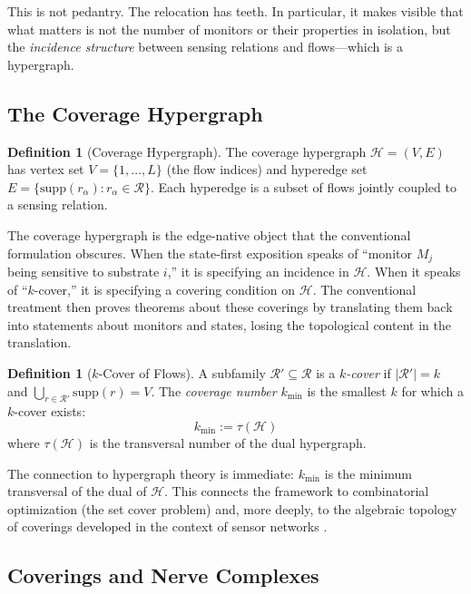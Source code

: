 \documentclass[11pt]{article}
\theoremstyle{definition}
\newtheorem{definition}[theorem]{Definition}
\theoremstyle{remark}
\begin{document}
This is not pedantry. The relocation has teeth. In particular, it makes visible that what matters is not the number of monitors or their properties in isolation, but the \emph{incidence structure} between sensing relations and flows---which is a hypergraph.

\subsection{The Coverage Hypergraph}

\begin{definition}[Coverage Hypergraph]
The coverage hypergraph $\mathcal{H} = (V, E)$ has vertex set $V = \{1, \ldots, L\}$ (the flow indices) and hyperedge set $E = \{\mathrm{supp}(r_\alpha) : r_\alpha \in \mathcal{R}\}$. Each hyperedge is a subset of flows jointly coupled to a sensing relation.
\end{definition}

The coverage hypergraph is the edge-native object that the conventional formulation obscures. When the state-first exposition speaks of ``monitor $M_j$ being sensitive to substrate $i$,'' it is specifying an incidence in $\mathcal{H}$. When it speaks of ``$k$-cover,'' it is specifying a covering condition on $\mathcal{H}$. The conventional treatment then proves theorems about these coverings by translating them back into statements about monitors and states, losing the topological content in the translation.

\begin{definition}[$k$-Cover of Flows]
A subfamily $\mathcal{R}' \subseteq \mathcal{R}$ is a \emph{$k$-cover} if $|\mathcal{R}'| = k$ and $\bigcup_{r \in \mathcal{R}'} \mathrm{supp}(r) = V$. The \emph{coverage number} $k_{\min}$ is the smallest $k$ for which a $k$-cover exists:
\begin{equation}
k_{\min} := \tau(\mathcal{H})
\end{equation}
where $\tau(\mathcal{H})$ is the transversal number of the dual hypergraph.
\end{definition}

The connection to hypergraph theory is immediate: $k_{\min}$ is the minimum transversal of the dual of $\mathcal{H}$. This connects the framework to combinatorial optimization (the set cover problem) and, more deeply, to the algebraic topology of coverings developed in the context of sensor networks \cite{deSilvaGhrist}.

\subsection{Coverings and Nerve Complexes}
\end{document}

